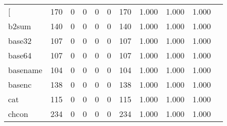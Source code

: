 \begin{longtable}{lp{1.10cm}p{1.10cm}p{1.10cm}p{1.10cm}p{1.10cm}p{1.10cm}p{1.10cm}p{1.10cm}p{1.10cm}p{1.10cm}}
\bottomrule
\endlastfoot
{[}         &                    170 &                                  0 &                                 0 &                                0 &                                 0 &                             170 &                          1.000 &                                 1.000 &                               1.000 \\
b2sum     &                    140 &                                  0 &                                 0 &                                0 &                                 0 &                             140 &                          1.000 &                                 1.000 &                               1.000 \\
base32    &                    107 &                                  0 &                                 0 &                                0 &                                 0 &                             107 &                          1.000 &                                 1.000 &                               1.000 \\
base64    &                    107 &                                  0 &                                 0 &                                0 &                                 0 &                             107 &                          1.000 &                                 1.000 &                               1.000 \\
basename  &                    104 &                                  0 &                                 0 &                                0 &                                 0 &                             104 &                          1.000 &                                 1.000 &                               1.000 \\
basenc    &                    138 &                                  0 &                                 0 &                                0 &                                 0 &                             138 &                          1.000 &                                 1.000 &                               1.000 \\
cat       &                    115 &                                  0 &                                 0 &                                0 &                                 0 &                             115 &                          1.000 &                                 1.000 &                               1.000 \\
chcon     &                    234 &                                  0 &                                 0 &                                0 &                                 0 &                             234 &                          1.000 &                                 1.000 &                               1.000 \\

\end{longtable}
